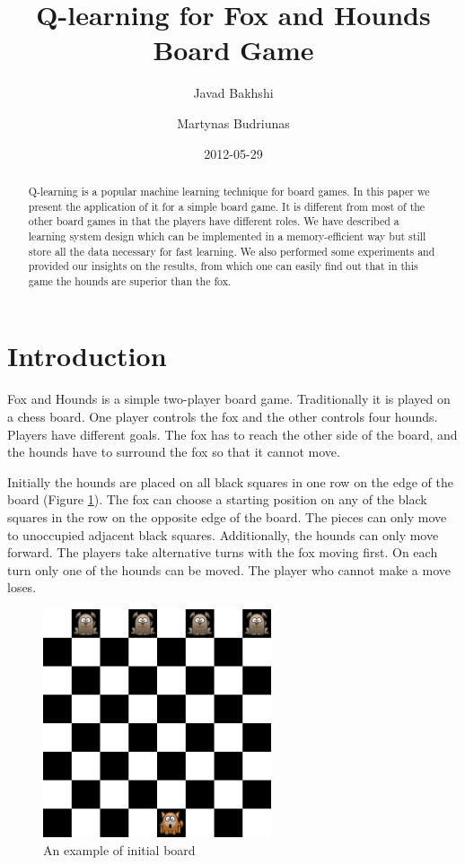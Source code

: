 \documentclass[a4paper]{article}
\title{Q-learning for Fox and Hounds Board Game}
\author{Javad Bakhshi \and Martynas Budriunas}
\date{2012-05-29}
\begin{document}
\maketitle

\begin{abstract}
Q-learning is a popular machine learning technique for board games. In this
paper we present the application of it for a simple board game. It is different
from most of the other board games in that the players have different roles.
We have described a learning system design which can be implemented in a
memory-efficient way but still store all the data necessary for fast learning.
We also performed some experiments and provided our insights on the results,
from which one can easily find out that in this game the hounds are superior
than the fox.
\end{abstract}

\section{Introduction}
Fox and Hounds is a simple two-player board game. Traditionally it is played on
a chess board. One player controls the fox and the other controls four hounds.
Players have different goals. The fox has to reach the other side of the board,
and the hounds have to surround the fox so that it cannot move.

Initially the hounds are placed on all black squares in one row on the edge of
the board (Figure \ref{fig:board}). The fox can choose a starting position on
any of the black squares in the row on the opposite edge of the board. The
pieces can only move to unoccupied adjacent black squares. Additionally, the
hounds can only move forward. The players take alternative turns with the fox
moving first. On each turn only one of the hounds can be moved. The player who
cannot make a move loses.

\begin{figure}[htb]
\centering
\includegraphics[width=0.6\textwidth]{board.png}
\caption{An example of initial board}
\label{fig:board}
\end{figure}
\end{document}
